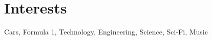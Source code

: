 \documentclass[a4paper]{deedy-resume} %
\begin{document}
\section{Interests}

Cars, Formula 1, Technology, Engineering, Science, Sci-Fi, Music








\end{document}
